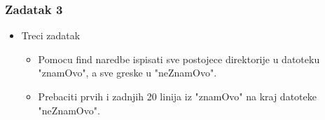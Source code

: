 \documentclass{beamer}
\begin{document}
\begin{frame}[t]
\frametitle{Zadatak 3}
\begin{itemize}
\item Treci zadatak
\begin{itemize}
	\item Pomocu find naredbe ispisati sve postojece direktorije u datoteku "znamOvo", a sve greske u "neZnamOvo". 
	\item Prebaciti prvih i zadnjih 20 linija iz "znamOvo" na kraj datoteke "neZnamOvo".
	
	
\end{itemize}
\end{itemize}

\end{frame}
\end{document}
